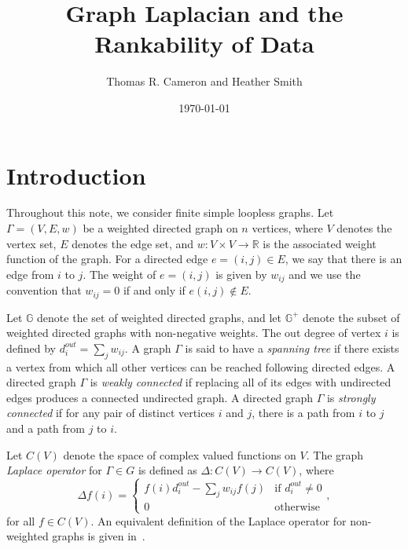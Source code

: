 \documentclass{article}
\title{Graph Laplacian and the Rankability of Data}
\author{Thomas R. Cameron and Heather Smith}
\date{\today}
\begin{document}
\maketitle
{}

\section{Introduction}	
Throughout this note, we consider finite simple loopless graphs.
Let $\Gamma=(V,E,w)$ be a weighted directed graph on $n$ vertices, where $V$ denotes the vertex set, $E$ denotes the edge set, and $w\colon V\times V\rightarrow\mathbb{R}$ is the associated weight function of the graph.
For a directed edge $e=(i,j)\in E$, we say that there is an edge from $i$ to $j$. 
The weight of $e=(i,j)$ is given by $w_{ij}$ and we use the convention that $w_{ij}=0$ if and only if $e(i,j)\notin E$.

Let $\mathbb{G}$ denote the set of weighted directed graphs, and let $\mathbb{G}^{+}$ denote the subset of weighted directed graphs with non-negative weights. 
The out degree of vertex $i$ is defined by $d_{i}^{out}=\sum_{j}w_{ij}$.
A graph $\Gamma$ is said to have a \emph{spanning tree} if there exists a vertex from which all other vertices can be reached following directed edges.
A directed graph $\Gamma$ is \emph{weakly connected} if replacing all of its edges with undirected edges produces a connected undirected graph.
A directed graph $\Gamma$ is \emph{strongly connected} if for any pair of distinct vertices $i$ and $j$, there is a path from $i$ to $j$ and a path from $j$ to $i$.

Let $C(V)$ denote the space of complex valued functions on $V$. 
The graph \emph{Laplace operator} for $\Gamma\in G$ is defined as $\Delta\colon C(V)\rightarrow C(V)$, where
\begin{equation}\label{eq:laplace}
\Delta f(i) = 	\begin{cases}
			f(i)d_{i}^{out} - \sum_{j}w_{ij}f(j) & \text{if $d_{i}^{out}\neq 0$} \\
			0 & \text{otherwise}
			\end{cases},
\end{equation}
for all $f\in C(V)$.
An equivalent definition of the Laplace operator for non-weighted graphs is given in~\cite{Wu2005}. 
\end{document}
